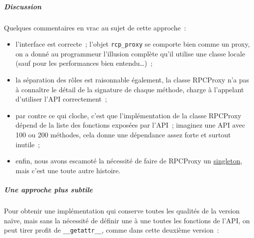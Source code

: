    \hypertarget{discussion}{%
\subparagraph{Discussion}\label{discussion}}

    Quelques commentaires en vrac au sujet de cette approche~:

\begin{itemize}
\tightlist
\item
  l'interface est correcte~; l'objet \texttt{rcp\_proxy} se comporte
  bien comme un proxy, on a donné au programmeur l'illusion complète
  qu'il utilise une classe locale (sauf pour les performances bien
  entendu\ldots{})~;
\item
  la séparation des rôles est raisonnable également, la classe RPCProxy
  n'a pas à connaître le détail de la signature de chaque méthode,
  charge à l'appelant d'utiliser l'API correctement~;
\item
  par contre ce qui cloche, c'est que l'implémentation de la classe
  RPCProxy dépend de la liste des fonctions exposées par l'API~;
  imaginez une API avec 100 ou 200 méthodes, cela donne une dépendance
  assez forte et surtout inutile~;
\item
  enfin, nous avons escamoté la nécessité de faire de RPCProxy un
  \href{http://en.wikipedia.org/wiki/Singleton_pattern}{singleton}, mais
  c'est une toute autre histoire.
\end{itemize}

    \hypertarget{une-approche-plus-subtile}{%
\subparagraph{Une approche plus
subtile}\label{une-approche-plus-subtile}}

    Pour obtenir une implémentation qui conserve toutes les qualités de la
version naïve, mais sans la nécessité de définir une à une toutes les
fonctions de l'API, on peut tirer profit de \texttt{\_\_getattr\_\_},
comme dans cette deuxième version~:

